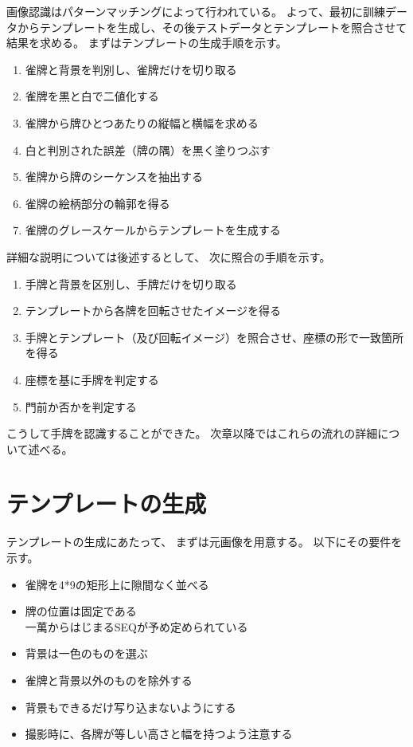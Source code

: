 \documentclass{jsarticle}
\begin{document}
\begin{multicols}{2}
画像認識はパターンマッチングによって行われている。
よって、最初に訓練データからテンプレートを生成し、その後テストデータとテンプレートを照合させて結果を求める。
まずはテンプレートの生成手順を示す。
\begin{enumerate}
\item 雀牌と背景を判別し、雀牌だけを切り取る
\item 雀牌を黒と白で二値化する
\item 雀牌から牌ひとつあたりの縦幅と横幅を求める
\item 白と判別された誤差（牌の隅）を黒く塗りつぶす
\item 雀牌から牌のシーケンスを抽出する
\item 雀牌の絵柄部分の輪郭を得る
\item 雀牌のグレースケールからテンプレートを生成する
\end{enumerate}

詳細な説明については後述するとして、
次に照合の手順を示す。
\begin{enumerate}
\item 手牌と背景を区別し、手牌だけを切り取る
\item テンプレートから各牌を回転させたイメージを得る
\item 手牌とテンプレート（及び回転イメージ）を照合させ、座標の形で一致箇所を得る
\item 座標を基に手牌を判定する
\item 門前か否かを判定する
\end{enumerate}

こうして手牌を認識することができた。
次章以降ではこれらの流れの詳細について述べる。

\section{テンプレートの生成}

テンプレートの生成にあたって、
まずは元画像を用意する。
以下にその要件を示す。
\begin{itemize}
\item 雀牌を4*9の矩形上に隙間なく並べる
\item 牌の位置は固定である \\
		  一萬からはじまるSEQが予め定められている
\item 背景は一色のものを選ぶ
\item 雀牌と背景以外のものを除外する
\item 背景もできるだけ写り込まないようにする
\item 撮影時に、各牌が等しい高さと幅を持つよう注意する
\end{itemize}


\end{multicols}
\end{document}
